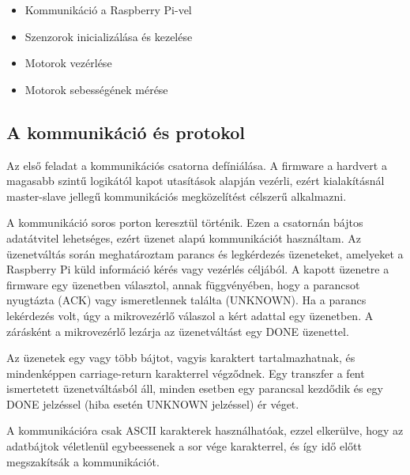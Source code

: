 \begin{itemize}
  \setlength\itemsep{0em}
\item{Kommunikáció a Raspberry Pi-vel}
\item{Szenzorok inicializálása és kezelése}
\item{Motorok vezérlése}
\item{Motorok sebességének mérése}
\end{itemize}

\subsection{A kommunikáció és protokol}

Az első feladat a kommunikációs csatorna defíniálása. A firmware a hardvert a
magasabb szintű logikától kapot utasítások alapján vezérli, ezért kialakításnál
master-slave jellegű kommunikációs megközelítést célszerű alkalmazni.

A kommunikáció soros porton keresztül történik. Ezen a csatornán bájtos
adatátvitel lehetséges, ezért üzenet alapú kommunikációt használtam. Az
üzenetváltás során meghatároztam parancs és legkérdezés üzeneteket, amelyeket a
Raspberry Pi küld információ kérés vagy vezérlés céljából. A kapott üzenetre a
firmware egy üzenetben választol, annak függvényében, hogy a parancsot nyugtázta
(ACK) vagy ismeretlennek találta (UNKNOWN). Ha a parancs lekérdezés volt, úgy a
mikrovezérlő válaszol a kért adattal egy üzenetben. A zárásként a mikrovezérlő
lezárja az üzenetváltást egy DONE üzenettel.

Az üzenetek egy vagy több bájtot, vagyis karaktert tartalmazhatnak, és
mindenképpen carriage-return karakterrel végződnek. Egy transzfer a fent
ismertetett üzenetváltásból áll, minden esetben egy parancsal kezdődik és egy
DONE jelzéssel (hiba esetén UNKNOWN jelzéssel) ér véget.

A kommunikációra csak ASCII karakterek használhatóak, ezzel elkerülve, hogy az
adatbájtok véletlenül egybeessenek a sor vége karakterrel, és így idő előtt
megszakítsák a kommunikációt.

